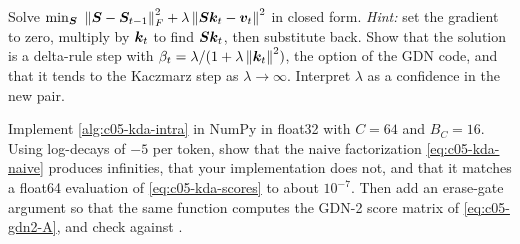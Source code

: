 \begin{exercise}\label{ex:c05-longhorn}
Solve $\min_{\bm{S}}\ \left\lVert \bm{S} - \bm{S}_{t-1}\right\rVert_F^2 + \lambda\left\lVert \bm{S}\bm{k}_t - \bm{v}_t\right\rVert^2$ in closed form.
\emph{Hint:} set the gradient to zero, multiply by $\bm{k}_t$ to find $\bm{S}\bm{k}_t$, then substitute back.
Show that the solution is a delta-rule step with $\beta_t = \lambda/(1 + \lambda\left\lVert \bm{k}_t\right\rVert^2)$,
the  option of the GDN code, and that it tends to the Kaczmarz step as
$\lambda\to\infty$. Interpret $\lambda$ as a confidence in the new pair.
\end{exercise}

\begin{exercise}\label{ex:c05-code}
Implement \cref{alg:c05-kda-intra} in NumPy in float32 with $C = 64$ and $B_C = 16$. Using
log-decays of $-5$ per token, show that the naive factorization \cref{eq:c05-kda-naive} produces
infinities, that your implementation does not, and that it matches a float64 evaluation of
\cref{eq:c05-kda-scores} to about $10^{-7}$. Then add an erase-gate argument so that the same
function computes the GDN-2 score matrix of \cref{eq:c05-gdn2-A}, and check 
against .
\end{exercise}
